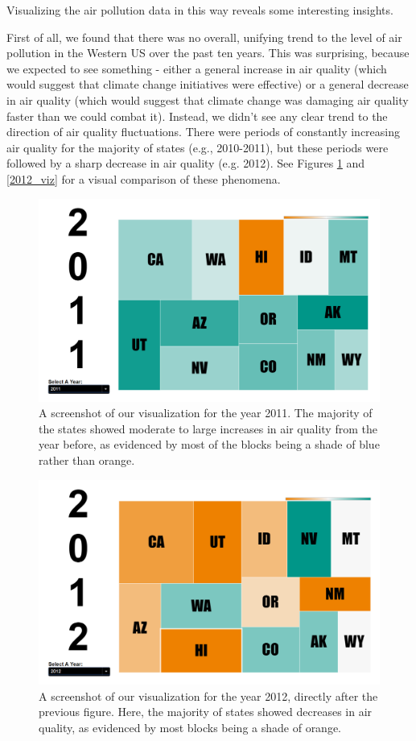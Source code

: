\documentclass[journal]{vgtc}                %
\begin{document}
Visualizing the air pollution data in this way reveals some interesting insights.

First of all, we found that there was no overall, unifying trend to the level of air pollution in the Western US
over the past ten years. This was surprising, because we expected to see something - either a general increase in air quality
(which would suggest that climate change initiatives were effective) or a general decrease in air quality (which
would suggest that climate change was damaging air quality faster than we could combat it). Instead, we didn't see any clear 
trend to the direction of air quality fluctuations. There were periods of constantly increasing air quality for the majority 
of states (e.g., 2010-2011), but these periods were followed by a sharp decrease in air quality (e.g. 2012). See Figures \ref{fig:2011_viz}
and \ref{2012_viz} for a visual comparison of these phenomena.

\begin{figure}
   \includegraphics[width=\columnwidth]{2011_viz.png}
   \caption{A screenshot of our visualization for the year 2011. The majority of the states showed moderate to large increases
   in air quality from the year before, as evidenced by most of the blocks being a shade of blue rather than orange. \label{fig:2011_viz}}
\end{figure}

\begin{figure}
   \includegraphics[width=\columnwidth]{2012_viz.png}
   \caption{A screenshot of our visualization for the year 2012, directly after the previous figure. Here, the majority of states
   showed decreases in air quality, as evidenced by most blocks being a shade of orange.\label{fig:2012_viz}}
\end{figure}
\end{document}
